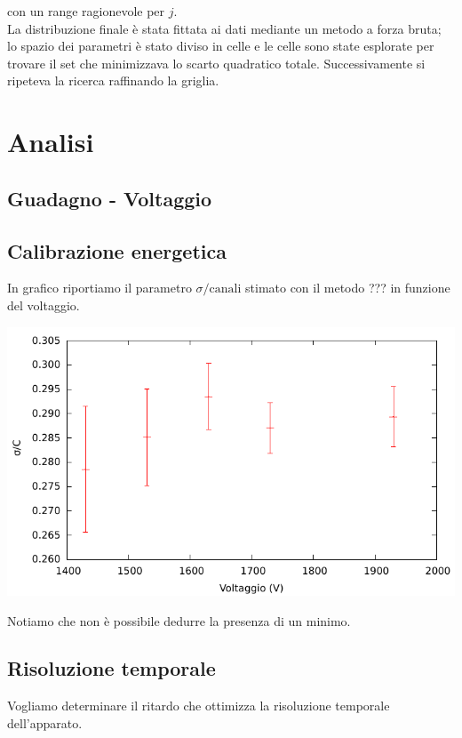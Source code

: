 \documentclass[10pt,a4paper]{article}
\begin{document}
con un range ragionevole per $j$.\\

La distribuzione finale è stata fittata ai dati mediante un metodo a forza bruta; lo spazio dei parametri è stato diviso in celle e le celle sono state esplorate per trovare il set che minimizzava lo scarto quadratico totale. Successivamente si ripeteva la ricerca raffinando la griglia.

\section{Analisi}

\subsection{Guadagno - Voltaggio}



\subsection{Calibrazione energetica}

In grafico riportiamo il parametro $\sigma / \text{canali}$ stimato con il metodo ??? in funzione del voltaggio.


\includegraphics[scale=1]{../out/chio/Guadagno_R1}

Notiamo che non è possibile dedurre la presenza di un minimo.

\subsection{Risoluzione temporale}

Vogliamo determinare il ritardo che ottimizza la risoluzione temporale dell'apparato.\\
\end{document}
